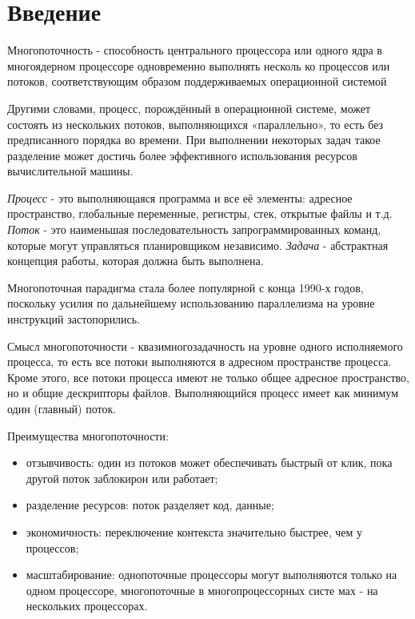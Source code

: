 \chapter*{Введение}

Многопоточность - способность центрального процессора или од­ного 
ядра в многоядерном процессоре одновременно выполнять несколь­
ко процессов или потоков, соответствующим образом поддерживаемых 
операционной системой

Другими словами, процесс, порождённый в операционной систе­ме, 
может состоять из нескольких потоков, выполняющихся «параллель­но»,
то есть без предписанного порядка во времени. При выполнении
некоторых задач такое разделение может достичь более эффективного
использования ресурсов вычислительной машины.

\textit{Процесс} - это выполняющаяся программа и все её элементы: 
ад­ресное пространство, глобальные переменные, регистры, стек, открытые
файлы и т.д. \textit{Поток} - это наименьшая последовательность 
запрограм­мированных команд, которые могут управляться планировщиком 
неза­висимо. \textit{Задача} - абстрактная концепция работы, которая должна быть
выполнена.

Многопоточная парадигма стала более популярной с конца 1990-х
годов, поскольку усилия по дальнейшему использованию параллелизма
на уровне инструкций застопорились.


Смысл многопоточности - квазимногозадачность на уровне одного
исполняемого процесса, то есть все потоки выполняются в адресном 
про­странстве процесса. Кроме этого, все потоки процесса имеют не только
общее адресное пространство, но и общие дескрипторы файлов. 
Выпол­няющийся процесс имеет как минимум один (главный) поток.


Преимущества многопоточности:
\begin{itemize}
	\item отзывчивость: один из потоков может обеспечивать быстрый от­
	клик, пока другой поток заблокирон или работает;
	\item разделение ресурсов: поток разделяет код, данные;
	\item экономичность: переключение контекста значительно быстрее,
	чем у процессов;
	\item масштабирование: однопоточные процессоры могут выполняются
	только на одном процессоре, многопоточные в многопроцессорных систе­
	мах - на нескольких процессорах.
\end{itemize}

